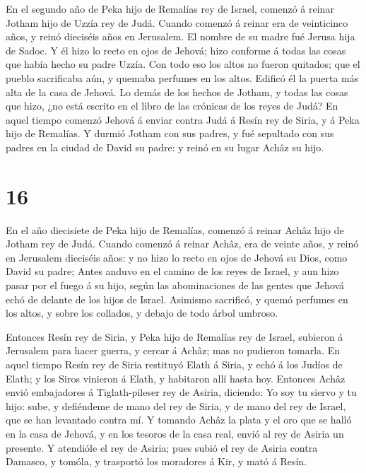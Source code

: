  En el segundo año de Peka hijo de Remalías rey de Israel,
comenzó á reinar Jotham hijo de Uzzía rey de Judá.  Cuando
comenzó á reinar era de veinticinco años, y reinó dieciséis años en
Jerusalem. El nombre de su madre fué Jerusa hija de Sadoc. 
Y él hizo lo recto en ojos de Jehová; hizo conforme á todas las cosas
que había hecho su padre Uzzía.  Con todo eso los altos no
fueron quitados; que el pueblo sacrificaba aún, y quemaba perfumes en
los altos. Edificó él la puerta más alta de la casa de Jehová.
 Lo demás de los hechos de Jotham, y todas las cosas que
hizo, ¿no está escrito en el libro de las crónicas de los reyes de Judá?
 En aquel tiempo comenzó Jehová á enviar contra Judá á
Resín rey de Siria, y á Peka hijo de Remalías.  Y durmió
Jotham con sus padres, y fué sepultado con sus padres en la ciudad de
David su padre: y reinó en su lugar Achâz su hijo.

\hypertarget{section-15}{%
\section{16}\label{section-15}}

 En el año diecisiete de Peka hijo de Remalías, comenzó á
reinar Achâz hijo de Jotham rey de Judá.  Cuando comenzó á
reinar Achâz, era de veinte años, y reinó en Jerusalem dieciséis años: y
no hizo lo recto en ojos de Jehová su Dios, como David su padre;
 Antes anduvo en el camino de los reyes de Israel, y aun
hizo pasar por el fuego á su hijo, según las abominaciones de las gentes
que Jehová echó de delante de los hijos de Israel.  Asimismo
sacrificó, y quemó perfumes en los altos, y sobre los collados, y debajo
de todo árbol umbroso.

 Entonces Resín rey de Siria, y Peka hijo de Remalías rey de
Israel, subieron á Jerusalem para hacer guerra, y cercar á Achâz; mas no
pudieron tomarla.  En aquel tiempo Resín rey de Siria
restituyó Elath á Siria, y echó á los Judíos de Elath; y los Siros
vinieron á Elath, y habitaron allí hasta hoy.  Entonces
Achâz envió embajadores á Tiglath-pileser rey de Asiria, diciendo: Yo
soy tu siervo y tu hijo: sube, y defiéndeme de mano del rey de Siria, y
de mano del rey de Israel, que se han levantado contra mí. 
Y tomando Achâz la plata y el oro que se halló en la casa de Jehová, y
en los tesoros de la casa real, envió al rey de Asiria un presente.
 Y atendióle el rey de Asiria; pues subió el rey de Asiria
contra Damasco, y tomóla, y trasportó los moradores á Kir, y mató á
Resín.

